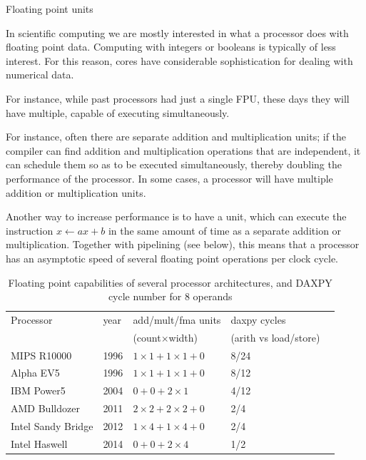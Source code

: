  {Floating point units}

In scientific computing we are mostly interested in what a processor
does with floating point data. Computing with integers or booleans 
is typically of less interest. For this reason, cores have
considerable sophistication for dealing with numerical data.

For instance, while past processors had just a single \acf{FPU},
these days they will have multiple, capable of executing
simultaneously.

For instance, often there are separate addition and
multiplication units; if the compiler can find addition and
multiplication operations that are independent, it can schedule them
so as to be executed simultaneously, thereby doubling the performance
of the processor. In some cases, a processor will have multiple
addition or multiplication units.

Another way to increase performance is to have a 
unit, which can execute the instruction $x\leftarrow ax+b$ in the same
amount of time as a separate addition or multiplication. Together with
pipelining (see below), this means that a processor has an asymptotic
speed of several floating point operations per clock cycle.

\begin{table}[h]
  \centering
  \begin{tabular}{p{2in}llll}
Processor&year&add/mult/fma units  &daxpy cycles\\
         &    &(count$\times$width)&(arith vs load/store)\\
\hline
MIPS R10000       &1996 &$1\times1+1\times1+0$ &8/24 \\
Alpha EV5         &1996 &$1\times1+1\times1+0$ &8/12 \\
IBM Power5        &2004 &$0+0+2\times1       $ &4/12 \\
AMD Bulldozer     &2011 &$2\times2+2\times2+0$ &2/4  \\
Intel Sandy Bridge&2012 &$1\times4+1\times4+0$ &2/4  \\
Intel Haswell     &2014 &$0+0+2\times 4      $ &1/2  \\
  \end{tabular}
  \caption{Floating point capabilities of several processor architectures,
  and DAXPY cycle number for 8 operands}
  \label{tab:chipfloats}
\end{table}

